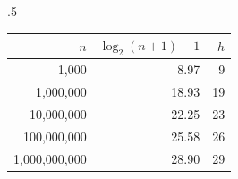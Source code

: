 \documentclass[10pt]{beamer}
\DeclarePairedDelimiter\ceil{\lceil}{\rceil}
\begin{document}
\begin{frame}[t]
{\begin{columns}[T]
\begin{column}{.5\linewidth}
		\begin{center}
		\begin{tabular}{| r | r | r |}
			\hline
			$n$ &$\log_{2}(n + 1) - 1$ &$h$\\
			\hline
			1,000 &8.97 &9\\
			1,000,000 &18.93 &19\\
			10,000,000 &22.25 &23\\
			100,000,000 &25.58 &26\\
			1,000,000,000 &28.90 &29\\
			\hline
		\end{tabular}
		\end{center}
		
		
	\end{column} %
	\end{columns} %
} %
\end{frame}




%
%
%
\end{document}
